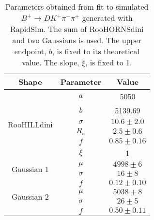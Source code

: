 \begin{table}
  \centering
  \begin{tabular}{ccc}
      \toprule
      Shape & Parameter & Value \\
      \midrule
\multirow{6}{*}{RooHILLdini} & $a$ & 5050 \\
 & $b$ & 5139.69 \\
 & $\sigma$ & $10.6 \pm 2.0$ \\
 & $R_\sigma$ & $2.5 \pm 0.6$ \\
 & $f$ & $0.85 \pm 0.16$ \\
 & $\xi$ & 1 \\
      \midrule
\multirow{2}{*}{Gaussian 1} & $\mu$ & $4998 \pm 6$ \\
 & $\sigma$ & $16 \pm 8$ \\
 & $f$ & $0.12 \pm 0.10$ \\
      \midrule
\multirow{2}{*}{Gaussian 2} & $\mu$ & $5038 \pm 8$ \\
 & $\sigma$ & $26 \pm 5$ \\
 & $f$ & $0.50 \pm 0.11$ \\
      \bottomrule
  \end{tabular}
  \caption{Parameters obtained from fit to simulated $B^+ \to DK^+\pi^-\pi^+$ generated with RapidSim. The sum of RooHORNSdini and two Gaussians is used. The upper endpoint, $b$, is fixed to its theoretical value. The slope, $\xi$, is fixed to 1.}
\label{tab:DKpipi_parameters}
\end{table}
